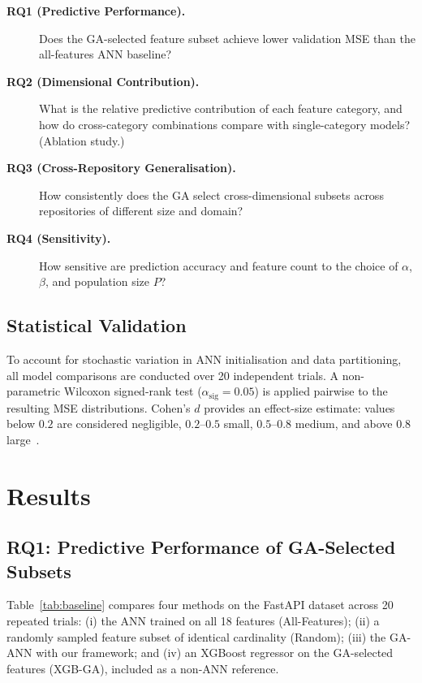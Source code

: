 \documentclass[11pt,a4paper]{article}
\begin{document}
\begin{description}
  \item[\textbf{RQ1 (Predictive Performance).}]
    Does the GA-selected feature subset achieve lower validation MSE than the
    all-features ANN baseline?
  \item[\textbf{RQ2 (Dimensional Contribution).}]
    What is the relative predictive contribution of each feature category, and
    how do cross-category combinations compare with single-category models?
    (Ablation study.)
  \item[\textbf{RQ3 (Cross-Repository Generalisation).}]
    How consistently does the GA select cross-dimensional subsets across
    repositories of different size and domain?
  \item[\textbf{RQ4 (Sensitivity).}]
    How sensitive are prediction accuracy and feature count to the choice of
    $\alpha$, $\beta$, and population size $P$?
\end{description}

\subsection{Statistical Validation}

To account for stochastic variation in ANN initialisation and data partitioning,
all model comparisons are conducted over 20 independent trials. A non-parametric
Wilcoxon signed-rank test ($\alpha_{\text{sig}} = 0.05$) is applied pairwise to
the resulting MSE distributions. Cohen's $d$ provides an effect-size estimate:
values below $0.2$ are considered negligible, $0.2$--$0.5$ small, $0.5$--$0.8$
medium, and above $0.8$ large~\cite{cohen1988}.

\section{Results}
\label{sec:results}

\subsection{RQ1: Predictive Performance of GA-Selected Subsets}
\label{subsec:rq1}

Table~\ref{tab:baseline} compares four methods on the FastAPI dataset across
20 repeated trials: (i) the ANN trained on all 18 features (All-Features);
(ii) a randomly sampled feature subset of identical cardinality (Random);
(iii) the GA-ANN with our framework; and (iv) an XGBoost regressor on the
GA-selected features (XGB-GA), included as a non-ANN reference.
\end{document}
